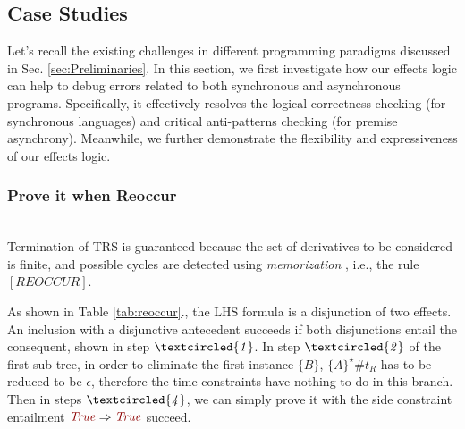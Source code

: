 \documentclass[acmsmall,10pt,review]{acmart}
\newcommand{\effect}{\textcolor{black}{\ensuremath{\mathrm{\Phi}}}}
\newcommand{\code}[1]{{\tt{\ensuremath{\m{#1}}}}}
\newcommand{\CONTAIN}{\sqsubseteq}
\newcommand{\m}{\mathit}
\newcommand\tabref[1]{Table \textcolor{black}{\ref{#1}}.}
\newcommand\secref[1]{Sec. \textcolor{black}{\ref{#1}}}
\begin{document}
{\subsection{Case Studies}
\label{subsec:Case_Studies}

Let's recall the existing challenges in different programming paradigms discussed in \secref{sec:Preliminaries}. In this section, we first investigate how our effects logic can help to debug errors related to both synchronous and asynchronous programs. Specifically, it effectively resolves the logical correctness checking (for synchronous languages) and critical anti-patterns checking (for premise asynchrony). 
Meanwhile, we further demonstrate the flexibility and expressiveness of our effects logic. 










\subsubsection{Prove it when Reoccur}~\\

Termination of TRS is guaranteed because the set of derivatives to be considered is finite, and possible cycles are detected using \emph{memorization} \cite{brotherston2005cyclic}, i.e., the rule \code{[REOCCUR]}. %






As shown in \tabref{tab:reoccur}, the LHS formula is a disjunction of two effects. An inclusion with a disjunctive antecedent succeeds if both disjunctions entail the consequent, shown in step \code{\textcircled{1}}.  
In step \code{\textcircled{2}} of the first sub-tree, in order to eliminate the first instance \code{\{B\}}, \code{\{A\}^\star \# t_R} has to be reduced to be \code{\epsilon}, therefore the time constraints have nothing to do in this branch. 
Then in steps \code{\code{\textcircled{4}}}, we
can simply prove it with the side constraint entailment \code{\textcolor {darkred}{True} \Rightarrow  \textcolor {darkred}{True}} succeed.


}
\end{document}
